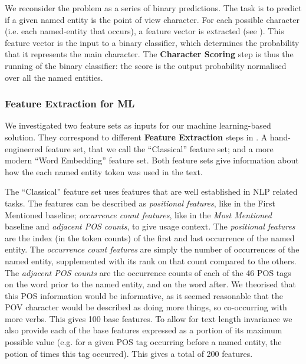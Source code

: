 \documentclass[]{book}
\begin{document}
We reconsider the problem as a series of binary predictions.
The task is to predict if a given named entity is the point of view character.
For each possible character (i.e. each named-entity that occurs), a feature vector is extracted (see ).
This feature vector is the input to a binary classifier, which determines the probability that it represents the main character.
The \textbf{Character Scoring} step is thus the running of the binary classifier:
the score is the output probability normalised over all the named entities.



\subsubsection{Feature Extraction for ML}\label{sec:feature-extraction-for-ml}
We investigated two feature sets as inputs for our machine learning-based solution.
They correspond to different \textbf{Feature Extraction} steps in .
A hand-engineered feature set, that we call the ``Classical'' feature set;
and a more modern ``Word Embedding'' feature set.
Both feature sets give information about how the each named entity token was used in the text.


The  ``Classical'' feature set uses features that are well established in NLP related tasks.
The features can be described as \emph{positional features}, like in the First Mentioned baseline; \emph{occurrence count features}, like in the \emph{Most Mentioned} baseline
and \emph{adjacent POS counts}, to give usage context.
The \emph{positional features} are the index (in the token counts) of the first and last occurrence of the named entity.
The \emph{occurrence count features} are simply the number of occurrences of the named entity, supplemented with its rank on that count compared to the others.
The \emph{adjacent POS counts} are the occurrence counts of each of the 46 POS tags on the word prior to the named entity, and on the word after.
We theorised that this POS information would be informative, as it seemed reasonable that the POV character would be described as doing more things, so co-occurring with more verbs.
This gives 100 base features.
To allow for text length invariance we also provide each of the base features expressed as a portion of its maximum possible value (e.g. for a given POS tag occurring before a named entity, the potion of times this tag occurred).
This gives a total of 200 features.
\end{document}
